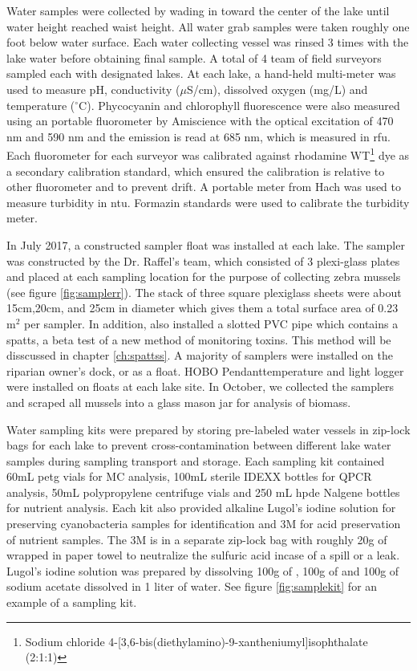 Water samples were collected by wading in toward the center of the lake until water height reached waist height. All water grab samples were taken roughly one foot below water surface. Each water collecting vessel was rinsed 3 times with the lake water before obtaining final sample. A total of 4 team of field surveyors sampled each with designated lakes. At each lake, a hand-held multi-meter was used to measure pH, conductivity ($\mu$S/cm), dissolved oxygen (mg/L) and temperature ($^\circ$C). Phycocyanin and chlorophyll fluorescence were also measured using an portable fluorometer by Amiscience with the optical excitation of 470 nm and 590 nm and the emission is read at 685 nm, which is measured in \gls{rfu}. Each fluorometer for each surveyor was calibrated against rhodamine WT\footnote{Sodium chloride 4-[3,6-bis(diethylamino)-9-xantheniumyl]isophthalate (2:1:1)} dye as a secondary calibration standard, which ensured the calibration is relative to other fluorometer and to prevent drift. A portable meter from Hach was used to measure turbidity in \gls{ntu}. Formazin standards were used to calibrate the turbidity meter.

In July 2017, a constructed sampler float was installed at each lake. The sampler was constructed by the Dr. Raffel's team, which consisted of 3 plexi-glass plates and placed at each sampling location for the purpose of collecting zebra mussels (see figure \ref{fig:samplerr}). The stack of three square plexiglass sheets were about 15cm,20cm, and 25cm in diameter which gives them a total surface area of 0.23 m$^2$ per sampler. In addition, also installed a slotted PVC pipe which contains a \gls{spatts}, a beta test of a new method of monitoring toxins. This method will be disscussed in chapter \ref{ch:spattss}. A majority of samplers were installed on the riparian owner's dock, or as a float. HOBO Pendant\texttrademark temperature and light logger were installed on floats at each lake site. In October, we collected the samplers and scraped all mussels into a glass mason jar for analysis of biomass.

Water sampling kits were prepared by storing pre-labeled water vessels in zip-lock bags for each lake to prevent cross-contamination between different lake water samples during sampling transport and storage. Each sampling kit contained 60mL \gls{petg} vials for MC analysis, 100mL sterile IDEXX bottles for QPCR analysis, 50mL polypropylene centrifuge vials and 250 mL \gls{hpde} Nalgene bottles for nutrient analysis. Each kit also provided alkaline Lugol's iodine solution for preserving cyanobacteria samples for identification and 3M  for acid preservation of nutrient samples. The 3M  is in a separate zip-lock bag with roughly 20g of  wrapped in paper towel to neutralize the sulfuric acid incase of a spill or a leak. Lugol's iodine solution was prepared by dissolving 100g of , 100g of  and 100g of sodium acetate dissolved in 1 liter of water. See figure \ref{fig:samplekit} for an example of a sampling kit.


